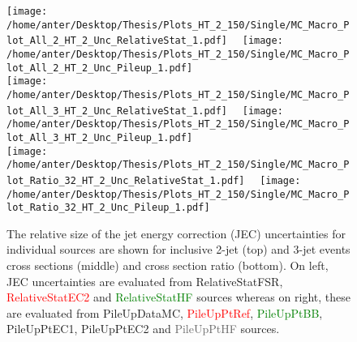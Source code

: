 \begin{figure}[!hbtp]
\hspace*{-5mm}\texttt{[image: /home/anter/Desktop/Thesis/Plots\_HT\_2\_150/Single/MC\_Macro\_Plot\_All\_2\_HT\_2\_Unc\_RelativeStat\_1.pdf]}%
~~\texttt{[image: /home/anter/Desktop/Thesis/Plots\_HT\_2\_150/Single/MC\_Macro\_Plot\_All\_2\_HT\_2\_Unc\_Pileup\_1.pdf]}\\
\hspace*{-5mm}\texttt{[image: /home/anter/Desktop/Thesis/Plots\_HT\_2\_150/Single/MC\_Macro\_Plot\_All\_3\_HT\_2\_Unc\_RelativeStat\_1.pdf]}%
~~\texttt{[image: /home/anter/Desktop/Thesis/Plots\_HT\_2\_150/Single/MC\_Macro\_Plot\_All\_3\_HT\_2\_Unc\_Pileup\_1.pdf]}\\
\hspace*{-5mm}\texttt{[image: /home/anter/Desktop/Thesis/Plots\_HT\_2\_150/Single/MC\_Macro\_Plot\_Ratio\_32\_HT\_2\_Unc\_RelativeStat\_1.pdf]}%
~~\texttt{[image: /home/anter/Desktop/Thesis/Plots\_HT\_2\_150/Single/MC\_Macro\_Plot\_Ratio\_32\_HT\_2\_Unc\_Pileup\_1.pdf]}\\
\caption{The relative size of the jet energy correction (JEC) uncertainties for individual sources are shown for inclusive 2-jet (top) and 3-jet events cross sections (middle) and cross section ratio \ratio (bottom). On left, JEC uncertainties are evaluated from \textcolor{blue2}{RelativeStatFSR}, \textcolor{red}{RelativeStatEC2} and \textcolor{green}{RelativeStatHF} sources whereas on right, these are evaluated from \textcolor{blue2}{PileUpDataMC}, \textcolor{red}{PileUpPtRef}, \textcolor{green}{PileUpPtBB}, \textcolor{pink2}{PileUpPtEC1}, \textcolor{deepsaffron}{PileUpPtEC2} and \textcolor{dimgray}{PileUpPtHF} sources.}
\label{fig:jes3}
\end{figure}

